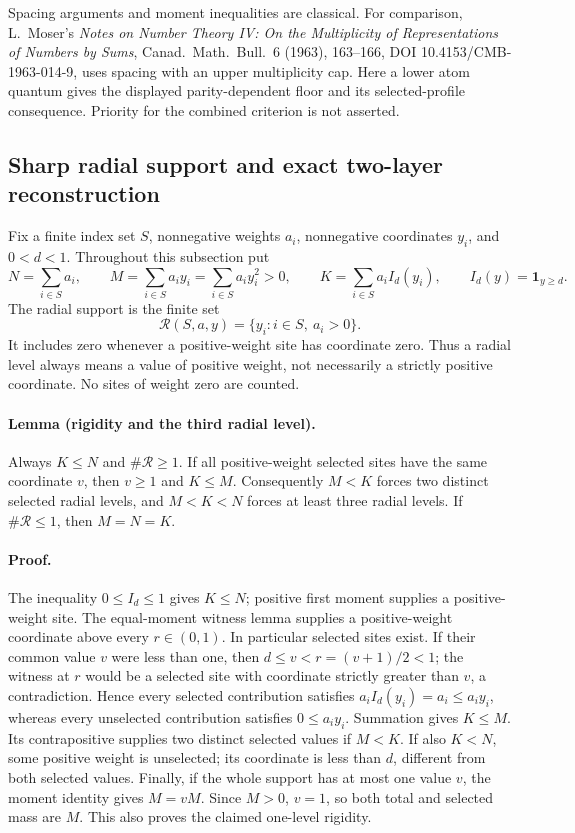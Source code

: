 Spacing arguments and moment inequalities are classical. For comparison,
L.~Moser's \emph{Notes on Number Theory IV: On the Multiplicity of
Representations of Numbers by Sums}, Canad.~Math.~Bull.~6 (1963),
163--166, DOI 10.4153/CMB-1963-014-9, uses spacing with an upper
multiplicity cap. Here a lower atom quantum gives the displayed
parity-dependent floor and its selected-profile consequence.
Priority for the combined criterion is not asserted.

\subsection{Sharp radial support and exact two-layer reconstruction}
\label{sec:radial-support-inverse}

Fix a finite index set \(S\), nonnegative weights \(a_i\), nonnegative
coordinates \(y_i\), and \(0<d<1\).  Throughout this subsection put
\[
 N=\sum_{i\in S}a_i,\qquad
 M=\sum_{i\in S}a_i y_i=\sum_{i\in S}a_i y_i^2>0,\qquad
 K=\sum_{i\in S}a_i I_d(y_i),\qquad I_d(y)=\mathbf1_{y\ge d}.
\]
The radial support is the finite set
\[
 \mathcal R(S,a,y)=\{y_i:i\in S,\ a_i>0\}.
\]
It includes zero whenever a positive-weight site has coordinate zero.
Thus a radial level always means a value of positive weight, not necessarily
a strictly positive coordinate.  No sites of weight zero are counted.

\paragraph{Lemma (rigidity and the third radial level).}
Always \(K\le N\) and \(\#\mathcal R\ge1\).  If all positive-weight
selected sites have the same coordinate \(v\), then \(v\ge1\) and
\(K\le M\).  Consequently \(M<K\) forces two distinct selected radial
levels, and \(M<K<N\) forces at least three radial levels.  If
\(\#\mathcal R\le1\), then \(M=N=K\).

\paragraph{Proof.}
The inequality \(0\le I_d\le1\) gives \(K\le N\); positive first
moment supplies a positive-weight site.  The equal-moment witness lemma
supplies a positive-weight coordinate above every \(r\in(0,1)\).
In particular selected sites exist.  If their common value \(v\) were
less than one, then \(d\le v<r=(v+1)/2<1\); the witness at \(r\)
would be a selected site with coordinate strictly greater than \(v\),
a contradiction.  Hence every selected contribution satisfies
\(a_i I_d(y_i)=a_i\le a_i y_i\), whereas every unselected contribution
satisfies \(0\le a_i y_i\).  Summation gives \(K\le M\).
Its contrapositive supplies two distinct selected values if \(M<K\).
If also \(K<N\), some positive weight is unselected; its coordinate is
less than \(d\), different from both selected values.  Finally, if the
whole support has at most one value \(v\), the moment identity gives
\(M=vM\).  Since \(M>0\), \(v=1\), so both total and selected mass
are \(M\).  This also proves the claimed one-level rigidity.

